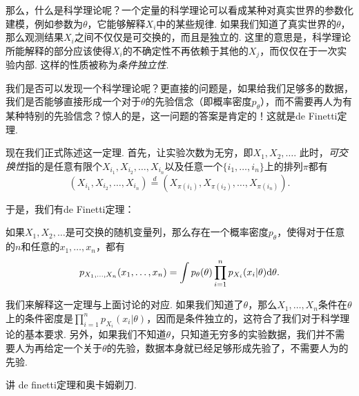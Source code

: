 那么，什么是科学理论呢？一个定量的科学理论可以看成某种对真实世界的参数化建模，例如参数为$\theta$，它能够解释$X_i$中的某些规律. 如果我们知道了真实世界的$\theta$，那么观测结果$X_i$之间不仅仅是可交换的，而且是独立的. 这里的意思是，科学理论所能解释的部分应该使得$X_i$的不确定性不再依赖于其他的$X_j$，而仅仅在于一次实验内部. 这样的性质被称为\emph{条件独立性}. 

我们是否可以发现一个科学理论呢？更直接的问题是，如果给我们足够多的数据，我们是否能够直接形成一个对于$\theta$的先验信念（即概率密度$p_\theta$），而不需要再人为有某种特别的先验信念？惊人的是，这一问题的答案是肯定的！这就是de Finetti定理. 

现在我们正式陈述这一定理. 首先，让实验次数为无穷，即$X_1,X_2,\dots$. 此时，\emph{可交换性}指的是任意有限个$X_{i_1},X_{i_2},\dots,X_{i_n}$以及任意一个$\{i_1,\dots,i_n\}$上的排列$\pi$都有
\[
    (X_{i_1},X_{i_2},\dots,X_{i_n})\stackrel{d}{=}(X_{\pi(i_1)},X_{\pi(i_2)},\dots,X_{\pi(i_n)}).
\]

于是，我们有de Finetti定理：

\begin{theorem}[de Finetti定理]
    如果$X_1,X_2,\dots$是可交换的随机变量列，那么存在一个概率密度$p_\theta$，使得对于任意的$n$和任意的$x_1,\dots,x_n$，都有
    \[
        p_{X_1,\dots,X_n}(x_1,\dots,x_n) = \int p_\theta(\theta)\prod_{i=1}^n p_{X_i}(x_i|\theta)\mathrm{d}\theta.
    \]
\end{theorem}

我们来解释这一定理与上面讨论的对应. 如果我们知道了$\theta$，那么$X_1,\dots,X_n$条件在$\theta$上的条件密度是$\prod_{i=1}^n p_{X_i}(x_i|\theta)$，因而是条件独立的，这符合了我们对于科学理论的基本要求. 另外，如果我们不知道$\theta$，只知道无穷多的实验数据，我们并不需要人为再给定一个关于$\theta$的先验，数据本身就已经足够形成先验了，不需要人为的先验. 


讲 de finetti定理和奥卡姆剃刀. 